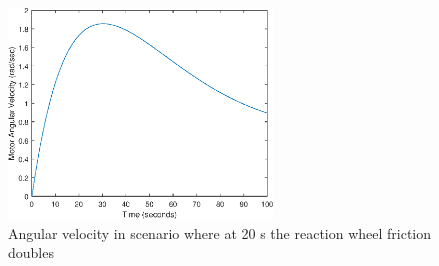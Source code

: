 \begin{figure}[h]
	\centering
	\includegraphics[width=70mm]{figures/omega_Noreconfig}
	\caption{Angular velocity in scenario where at 20 s the reaction wheel friction doubles}
	\label{fig:residualOmega}
\end{figure} 


%
%
%
%
%
%
%
%
%
%
